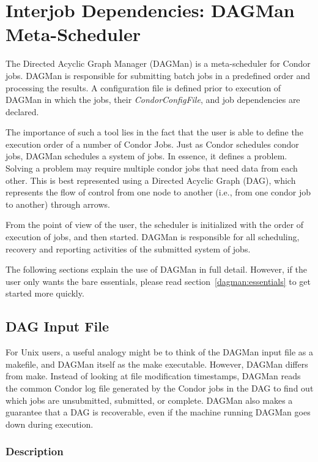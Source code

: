 \section{\label{sec:DAGMan}Interjob Dependencies: DAGMan Meta-Scheduler}

The Directed Acyclic Graph Manager (DAGMan) is a meta-scheduler for Condor
jobs.  DAGMan is responsible for submitting batch jobs in a predefined order
and processing the results. A configuration file is defined prior to execution
of DAGMan in which the jobs, their \textit{CondorConfigFile}, and job
dependencies are declared.

The importance of such a tool lies in the fact that the user is able to define
the execution order of a number of Condor Jobs. Just as Condor schedules
condor jobs, DAGMan schedules a system of jobs. In essence, it defines a
problem. Solving a problem may require multiple condor jobs that need data
from each other. This is best represented using a Directed Acyclic Graph
(DAG), which represents the flow of control from one node to another (i.e.,
from one condor job to another) through arrows.

From the point of view of the user, the scheduler is initialized with the
order of execution of jobs, and then started. DAGMan is responsible for all
scheduling, recovery and reporting activities of the submitted system of jobs.

The following sections explain the use of DAGMan in full detail.  However, if
the user only wants the bare essentials, please read
section~\ref{dagman:essentials} to get started more quickly.

\subsection{DAG Input File}

For Unix users, a useful analogy might be to think of the DAGMan input file as
a makefile, and DAGMan itself as the make executable.  However, DAGMan differs
from make.  Instead of looking at file modification timestamps, DAGMan reads
the common Condor log file generated by the Condor jobs in the DAG to find out
which jobs are unsubmitted, submitted, or complete.  DAGMan also makes a
guarantee that a DAG is recoverable, even if the machine running DAGMan goes
down during execution.

\subsubsection{\label{dagman:dagdesc}Description}

